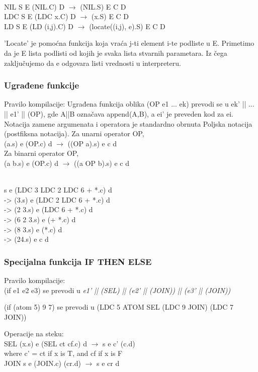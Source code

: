 \begin{primer} ~\\
NIL S E (NIL.C) D $\rightarrow$ (NIL.S) E C D\\
LDC S E (LDC x.C) D $\rightarrow$ (x.S) E C D\\
LD S E (LD (i,j).C) D $\rightarrow$ (locate((i,j), e).S) E C D\\
\end{primer}
'Locate' je pomoćna funkcija koja vraća j-ti element i-te podliste u E. Primetimo da je E lista podlisti od kojih je svaka lista stvarnih parametara. Iz čega zaključujemo da e odgovara listi vrednosti u interpreteru.

\subsubsection{Ugrađene funkcije}
Pravilo kompilacije: Ugrađena funkcija oblika (OP e1 ... ek) prevodi se u ek' || ... || e1' || (OP), gde A||B označava append(A,B), a ei' je preveden kod za ei. Notacija zamene argumenata i operatora je standardno obrnuta Poljska notacija (postfiksna notacija).
Za unarni operator OP,\\
(a.s) e (OP.c) d $\rightarrow$ ((OP a).s) e c d\\
Za binarni operator OP,\\
(a b.s) e (OP.c) d $\rightarrow$ ((a OP b).s) e c d
\begin{primer} ~\\
s e (LDC 3 LDC 2 LDC 6 + *.c) d\\
-> (3.s) e (LDC 2 LDC 6 + *.c) d\\
-> (2 3.s) e (LDC 6 + *.c) d\\
-> (6 2 3.s) e (+ *.c) d\\
-> (8 3.s) e (*.c) d\\
-> (24.s) e c d\\
\end{primer}
\subsubsection{Specijalna funkcija IF THEN ELSE}
\noindent Pravilo kompilacije:\\
(if e1 e2 e3) se prevodi u {\em e1' || (SEL) || (e2' || (JOIN)) || (e3' || (JOIN))}\\
\begin{primer}
(if (atom 5) 9 7) se prevodi u (LDC 5 ATOM SEL (LDC 9 JOIN) (LDC 7 JOIN))\\
\end{primer}
Operacije na steku:\\
SEL (x.s) e (SEL ct cf.c) d $\rightarrow$ s e c' (c.d)\\
where c' = ct if x is T, and cf if x is F\\
JOIN s e (JOIN.c) (cr.d) $\rightarrow$ s e cr d\\

